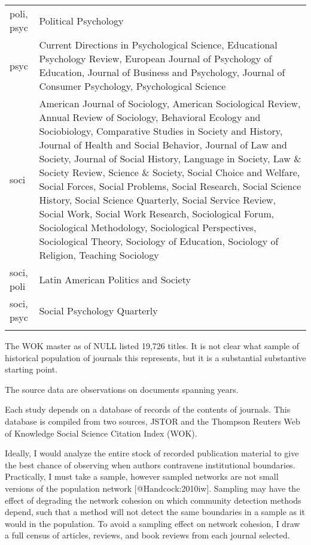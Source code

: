 \begin{table}[!htbp]
\begin{tabular}{@{\extracolsep{5pt}} p{1in}p{4in}}
   poli, psyc & Political Psychology \\ 
   psyc & Current Directions in Psychological Science, Educational Psychology Review, European Journal of Psychology of Education, Journal of Business and Psychology, Journal of Consumer Psychology, Psychological Science \\ 
   soci & American Journal of Sociology, American Sociological Review, Annual Review of Sociology, Behavioral Ecology and Sociobiology, Comparative Studies in Society and History, Journal of Health and Social Behavior, Journal of Law and Society, Journal of Social History, Language in Society, Law \& Society Review, Science \& Society, Social Choice and Welfare, Social Forces, Social Problems, Social Research, Social Science History, Social Science Quarterly, Social Service Review, Social Work, Social Work Research, Sociological Forum, Sociological Methodology, Sociological Perspectives, Sociological Theory, Sociology of Education, Sociology of Religion, Teaching Sociology \\ 
   soci, poli & Latin American Politics and Society \\ 
   soci, psyc & Social Psychology Quarterly \\ 
   \hline \\[-1.8ex] 
   \end{tabular} 
   \end{table}

The WOK master as of NULL listed 19,726 titles. It is not clear what
sample of historical population of journals this represents, but it is a
substantial substantive starting point.

The source data are observations on documents spanning years.

Each study depends on a database of records of the contents of journals.
This database is compiled from two sources, JSTOR and the Thompson
Reuters Web of Knowledge Social Science Citation Index (WOK).

Ideally, I would analyze the entire stock of recorded publication
material to give the best chance of observing when authors contravene
institutional boundaries. Practically, I must take a sample, however
sampled networks are not small versions of the population network
[@Handcock:2010iw]. Sampling may have the effect of degrading the
network cohesion on which community detection methods depend, such that
a method will not detect the same boundaries in a sample as it would in
the population. To avoid a sampling effect on network cohesion, I draw a
full census of articles, reviews, and book reviews from each journal
selected.

